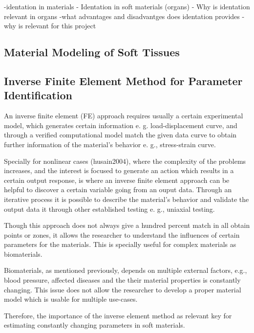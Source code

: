 -identation in materials
- Identation in soft materials (organs)
- Why is identation relevant in organs
-what advantages and disadvantges does identation provides
-why is relevant for this project 

\subsection{Material Modeling of Soft Tissues}
 


\subsection{Inverse Finite Element Method for Parameter Identification}

An inverse finite element (FE) approach requires usually a certain experimental model,
 which generates certain information e. g. load-displacement curve, and through 
a verified computational model match the given data curve to obtain further information 
of the material's behavior e. g., stress-strain curve.

Specially for nonlinear cases (husain2004), where the complexity of the problems 
increases, and the interest is focused to generate an action which results in a 
certain output response, is where an inverse finite element approach can be helpful 
to discover a certain variable going from an ouput data. Through an iterative process it is 
possible to describe the material's behavior and validate the output data it 
through other established testing e. g., uniaxial testing.

Though this approach does not always give a hundred percent match in all obtain points 
or zones, it allows the researcher to understand the influences of certain parameters 
for the materials. This is specially useful for complex materials as biomaterials. 

Biomaterials, as mentioned previously, depends on multiple external factors, e.g., blood 
pressure, affected diseases and the their material properties is constantly changing. 
This issue does not allow the researcher to develop a proper material model which is 
usable for multiple use-cases. 

Therefore, the importance of the inverse element method as relevant key for estimating 
constantly changing parameters in soft materials.

